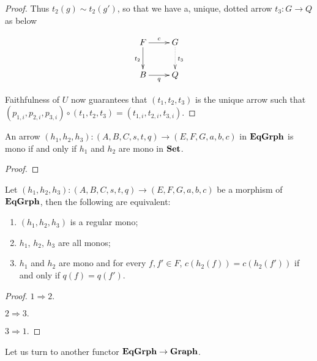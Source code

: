 \begin{proof}
	Thus $t_2(g)\sim t_2(g')$, so that we have a, unique, dotted arrow $t_3\colon G\to Q$ as below
	
	\[\xymatrix{ F \ar[d]_{t_{2}} \ar[r]^{c} & G \ar@{.>}[d]^{t_{3}}\\ B \ar[r]_{q} & Q}\]
	
	Faithfulness of $U$ now guarantees that $(t_1, t_2, t_3)$ is the unique arrow such that $(p_{1,i}, p_{2,i}, p_{3,i})\circ(t_1, t_2, t_3)=(t_{1,i},t_{2, i}, t_{3,i})$.
	
	
\end{proof}




\begin{cor}
	An arrow $(h_1, h_2, h_3)\colon (A, B, C, s,t, q)\to (E, F, G, a,b,c)$ in $\mathbf{EqGrph}$ is mono if and only if $h_1$ and $h_2$ are mono in $\mathbf{Set}$.
\end{cor}
\begin{proof}
\end{proof}



\begin{cor}Let $(h_1, h_2, h_3)\colon (A, B, C, s,t, q)\to (E, F, G, a,b,c)$ be a morphism of $\mathbf{EqGrph}$, then the following are equivalent:
	\begin{enumerate}
		\item $(h_1, h_2, h_3)$ is a regular mono;
		\item $h_1$, $h_2$, $h_3$ are all monos;
		\item $h_1$ and $h_2$ are mono and for every $f, f'\in F$, $c(h_2(f))=c(h_2(f'))$ if and only if $q(f)=q(f')$.
	\end{enumerate}
\end{cor}
\begin{proof}
	$1\Rightarrow 2.$  
	
	\smallskip \noindent
	$2\Rightarrow 3.$ 
	
	\smallskip \noindent 
	$3\Rightarrow 1.$
\end{proof}

Let us turn to another functor $\mathbf{EqGrph}\to \mathbf{Graph}$.

